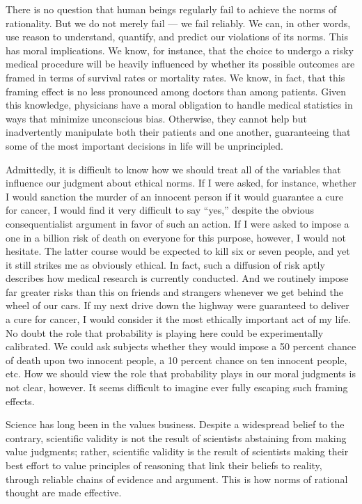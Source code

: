 \documentclass[a4paper,14pt]{extbook}
\begin{document}
There is no question that human beings regularly fail to achieve the norms of rationality.
But we do not merely fail --- we fail reliably.
We can, in other words, use reason to understand, quantify, and predict our violations of its norms.
This has moral implications.
We know, for instance, that the choice to undergo a risky medical procedure will be heavily influenced by whether its possible outcomes are framed in terms of survival rates or mortality rates.
We know, in fact, that this framing effect is no less pronounced among doctors than among patients.
Given this knowledge, physicians have a moral obligation to handle medical statistics in ways that minimize unconscious bias.
Otherwise, they cannot help but inadvertently manipulate both their patients and one another, guaranteeing that some of the most important decisions in life will be unprincipled.

Admittedly, it is difficult to know how we should treat all of the variables that influence our judgment about ethical norms.
If I were asked, for instance, whether I would sanction the murder of an innocent person if it would guarantee a cure for cancer, I would find it very difficult to say ``yes,'' despite the obvious consequentialist argument in favor of such an action.
If I were asked to impose a one in a billion risk of death on everyone for this purpose, however, I would not hesitate.
The latter course would be expected to kill six or seven people, and yet it still strikes me as obviously ethical.
In fact, such a diffusion of risk aptly describes how medical research is currently conducted.
And we routinely impose far greater risks than this on friends and strangers whenever we get behind the wheel of our cars.
If my next drive down the highway were guaranteed to deliver a cure for cancer, I would consider it the most ethically important act of my life.
No doubt the role that probability is playing here could be experimentally calibrated.
We could ask subjects whether they would impose a 50 percent chance of death upon two innocent people, a 10 percent chance on ten innocent people, etc.
How we should view the role that probability plays in our moral judgments is not clear, however.
It seems difficult to imagine ever fully escaping such framing effects.

Science has long been in the values business.
Despite a widespread belief to the contrary, scientific validity is not the result of scientists abstaining from making value judgments;
rather, scientific validity is the result of scientists making their best effort to value principles of reasoning that link their beliefs to reality, through reliable chains of evidence and argument.
This is how norms of rational thought are made effective.
\end{document}
